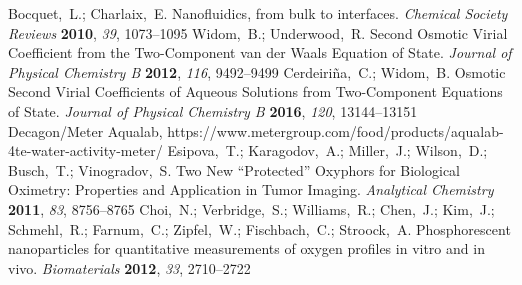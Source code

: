 \documentclass[aps,prl,twocolumn,superscriptaddress,groupedaddress]{revtex4}
\begin{document}
\begin{mcitethebibliography}{88}
\mciteBstWouldAddEndPuncttrue
\mciteSetBstMidEndSepPunct{\mcitedefaultmidpunct}
{\mcitedefaultendpunct}{\mcitedefaultseppunct}\relax
\EndOfBibitem
{}
Bocquet,~L.; Charlaix,~E. Nanofluidics, from bulk to interfaces. \emph{Chemical
  Society Reviews} \textbf{2010}, \emph{39}, 1073--1095\relax
\mciteBstWouldAddEndPuncttrue
\mciteSetBstMidEndSepPunct{\mcitedefaultmidpunct}
{\mcitedefaultendpunct}{\mcitedefaultseppunct}\relax
\EndOfBibitem
{}
Widom,~B.; Underwood,~R. Second Osmotic Virial Coefficient from the
  Two-Component van der Waals Equation of State. \emph{Journal of Physical
  Chemistry B} \textbf{2012}, \emph{116}, 9492--9499\relax
\mciteBstWouldAddEndPuncttrue
\mciteSetBstMidEndSepPunct{\mcitedefaultmidpunct}
{\mcitedefaultendpunct}{\mcitedefaultseppunct}\relax
\EndOfBibitem
{}
Cerdeiri{\~n}a,~C.; Widom,~B. Osmotic Second Virial Coefficients of Aqueous
  Solutions from Two-Component Equations of State. \emph{Journal of Physical
  Chemistry B} \textbf{2016}, \emph{120}, 13144--13151\relax
\mciteBstWouldAddEndPuncttrue
\mciteSetBstMidEndSepPunct{\mcitedefaultmidpunct}
{\mcitedefaultendpunct}{\mcitedefaultseppunct}\relax
\EndOfBibitem
Decagon/Meter Aqualab, https://www.metergroup.com/food/products/aqualab-4te-water-activity-meter/
\EndOfBibitem
{}
Esipova,~T.; Karagodov,~A.; Miller,~J.; Wilson,~D.; Busch,~T.; Vinogradov,~S.
  Two New ``Protected'' Oxyphors for Biological Oximetry: Properties and
  Application in Tumor Imaging. \emph{Analytical Chemistry} \textbf{2011},
  \emph{83}, 8756--8765\relax
\mciteBstWouldAddEndPuncttrue
\mciteSetBstMidEndSepPunct{\mcitedefaultmidpunct}
{\mcitedefaultendpunct}{\mcitedefaultseppunct}\relax
\EndOfBibitem
{}
Choi,~N.; Verbridge,~S.; Williams,~R.; Chen,~J.; Kim,~J.; Schmehl,~R.;
  Farnum,~C.; Zipfel,~W.; Fischbach,~C.; Stroock,~A. Phosphorescent
  nanoparticles for quantitative measurements of oxygen profiles in vitro and
  in vivo. \emph{Biomaterials} \textbf{2012}, \emph{33}, 2710--2722\relax
\mciteBstWouldAddEndPuncttrue
\mciteSetBstMidEndSepPunct{\mcitedefaultmidpunct}
{\mcitedefaultendpunct}{\mcitedefaultseppunct}\relax

\end{mcitethebibliography}
\end{document}
